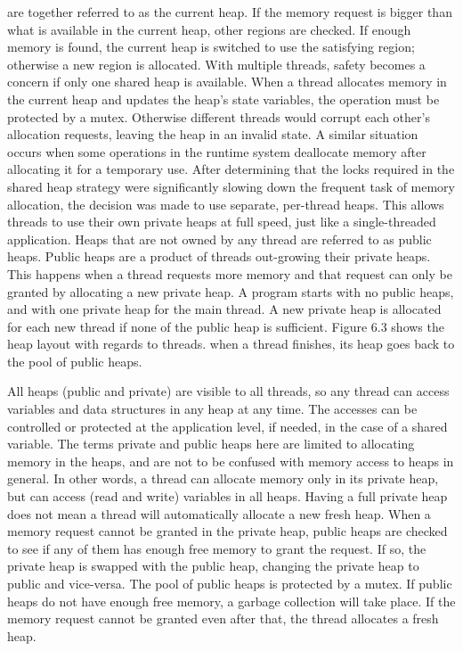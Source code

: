 are together referred to as the current heap. If the memory request is bigger than what is available
in the current heap, other regions are checked. If enough memory is found, the current heap is
switched to use the satisfying region; otherwise a new region is allocated.
With multiple threads, safety becomes a concern if only one shared heap is available.
When a thread allocates memory in the current heap and updates the heap's state variables,
the operation must be protected by a mutex. Otherwise different threads would corrupt each
other's allocation requests, leaving the heap in an invalid state. A similar situation occurs
when some operations in the runtime system deallocate memory after allocating it for a temporary use.
After determining that the locks required in the shared heap strategy were significantly slowing
down the frequent task of memory allocation, the decision was made to use separate, per-thread heaps.
This allows threads to use their own private heaps at full speed, just like a single-threaded application.
Heaps that are not owned by any thread are referred to as public heaps. Public heaps are a product of
threads out-growing their private heaps. This happens when a thread requests more memory and that
request can only be granted by allocating a new private heap. A program starts with no public heaps,
and with one private heap for the main thread. A new private heap is allocated for each new thread if
none of the public heap is sufficient. Figure 6.3 shows the heap layout with regards to threads. when
a thread finishes, its heap goes back to the pool of public heaps.

All heaps (public and private) are visible to all threads, so any thread can access variables
and data structures in any heap at any time. The accesses can be controlled or protected at the
application level, if needed, in the case of a shared variable. The terms private and public heaps
here are limited to allocating memory in the heaps, and are not to be confused with memory access
to heaps in general. In other words, a thread can allocate memory only in its private heap,
but can access (read and write) variables in all heaps.
Having a full private heap does not mean a thread will automatically allocate a new fresh heap.
When a memory request cannot be granted in the private heap, public heaps are checked to see if
any of them has enough free memory to grant the request. If so, the private heap is swapped with
the public heap, changing the private heap to public and vice-versa. The pool of public heaps is
protected by a mutex. If public heaps do not have enough free memory, a garbage collection will
take place. If the memory request cannot be granted even after that, the thread allocates a fresh heap.


